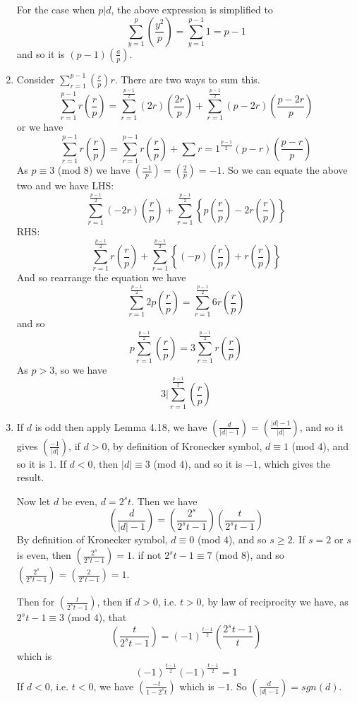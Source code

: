 \begin{enumerate}
    For the case when $p|d$, the above expression is simplified to
    $$\sum_{y=1}^{p}\left(\frac{y^2}{p}\right)=\sum_{y=1}^{p-1}1=p-1$$
    and so it is $(p-1)(\frac{a}{p})$.\\
\item Consider $\sum_{r=1}^{p-1}(\frac{r}{p})r$. There are two ways to sum this.
    $$\sum_{r=1}^{p-1}r\left(\frac{r}{p}\right)=\sum_{r=1}^{\frac{p-1}{2}}(2r)\left(\frac{2r}{p}\right)
    +\sum_{r=1}^{\frac{p-1}{2}}(p-2r)\left(\frac{p-2r}{p}\right)$$
    or we have
    $$\sum_{r=1}^{p-1}r\left(\frac{r}{p}\right)=\sum_{r=1}^{p-1}r\left(\frac{r}{p}\right)
    +\sum{r=1}^{\frac{p-1}{2}}(p-r)\left(\frac{p-r}{p}\right)$$
    As $p \equiv 3$ (mod $8$) we have $(\frac{-1}{p})=(\frac{2}{p})=-1$.
    So we can equate the above two and we have
    LHS:
    $$\sum_{r=1}^{\frac{p-1}{2}}(-2r)\left(\frac{r}{p}\right)+
    \sum_{r=1}^{\frac{p-1}{2}}\left\{p\left(\frac{r}{p}\right)-2r\left(\frac{r}{p}\right)\right\}$$
    RHS:
    $$\sum_{r=1}^{\frac{p-1}{2}}r\left(\frac{r}{p}\right)
    +\sum_{r=1}^{\frac{p-1}{2}}\left\{(-p)\left(\frac{r}{p}\right)+r \left(\frac{r}{p}\right)\right\}$$
    And so rearrange the equation we have
    $$\sum_{r=1}^{\frac{p-1}{2}} 2p\left(\frac{r}{p}\right)
    =\sum_{r=1}^{\frac{p-1}{2}}6r\left(\frac{r}{p}\right)$$
    and so $$p \sum_{r=1}^{\frac{p-1}{2}}\left(\frac{r}{p}\right)
    =3 \sum_{r=1}^{\frac{p-1}{2}}r\left(\frac{r}{p}\right)$$
    As $p > 3$, so we have
    $$3|\sum_{r=1}^{\frac{p-1}{2}}\left(\frac{r}{p}\right)$$
\item If $d$ is odd then apply Lemma 4.18, we have $(\frac{d}{|d|-1})=(\frac{|d|-1}{|d|})$, and so it gives $(\frac{-1}{|d|})$, if $d>0$, by definition of Kronecker symbol, $d \equiv 1$ (mod $4$), and so it is $1$.
    If $d<0$, then $|d| \equiv 3$ (mod $4$), and so it is $-1$, which gives the result.

    Now let $d$ be even, $d=2^s t$. Then we have
    $$\left(\frac{d}{|d|-1}\right)=\left(\frac{2^s}{2^s t-1}\right)\left(\frac{t}{2^s t-1}\right)$$
    By definition of Kronecker symbol, $d \equiv 0$ (mod $4$), and so $s \ge 2$.
    If $s =2$ or $s$ is even, then $(\frac{2^s}{2^s t-1})=1$. if not $2^s t -1 \equiv 7$ (mod $8$), and so $(\frac{2^s}{2^s t-1})=(\frac{2}{2^s t -1})=1$.

    Then for $(\frac{t}{2^s t -1})$, then if $d>0$, i.e. $t>0$, by law of reciprocity we have, as
    $2^s t-1 \equiv 3$ (mod $4$), that
    $$\left(\frac{t}{2^s t -1}\right)=(-1)^{\frac{t-1}{2}}\left(\frac{2^s t-1}{t}\right)$$ which is $$(-1)^{\frac{t-1}{2}}(-1)^{\frac{t-1}{2}}=1$$
    If $d<0$, i.e. $t<0$, we have $(\frac{-t}{1-2^s t})$ which is $-1$.
    So $(\frac{d}{|d|-1})=sgn(d)$.


\end{enumerate}

